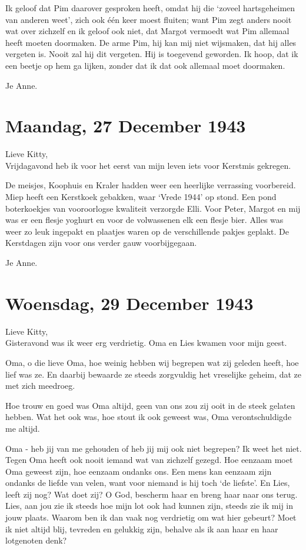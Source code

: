 \documentclass{book}
\begin{document}
Ik geloof dat Pim daarover gesproken heeft, omdat hij die `zoveel hartsgeheimen
van anderen weet', zich ook één keer moest fluiten; want Pim zegt anders nooit
wat over zichzelf en ik geloof ook niet, dat Margot vermoedt wat Pim allemaal
heeft moeten doormaken. De arme Pim, hij kan mij niet wijsmaken, dat hij alles
vergeten is. Nooit zal hij dit vergeten. Hij is toegevend geworden. Ik hoop, dat
ik een beetje op hem ga lijken, zonder dat ik dat ook allemaal moet doormaken.

Je Anne.

\section*{Maandag, 27 December 1943}

Lieve Kitty,\\
Vrijdagavond heb ik voor het eerst van mijn leven iets voor
Kerstmis gekregen.

De meisjes, Koophuis en Kraler hadden weer een heerlijke verrassing voorbereid.
Miep heeft een Kerstkoek gebakken, waar `Vrede 1944' op stond. Een pond
boterkoekjes van vooroorlogse kwaliteit verzorgde Elli.  Voor Peter, Margot en
mij was er een flesje yoghurt en voor de volwassenen elk een flesje bier. Alles
was weer zo leuk ingepakt en plaatjes waren op de verschillende pakjes geplakt.
De Kerstdagen zijn voor ons verder gauw voorbijgegaan.

Je Anne.

\section*{Woensdag, 29 December 1943}

Lieve Kitty,\\
Gisteravond was ik weer erg verdrietig. Oma en Lies kwamen voor
mijn geest.

Oma, o die lieve Oma, hoe weinig hebben wij begrepen wat zij geleden heeft, hoe
lief was ze. En daarbij bewaarde ze steeds zorgvuldig het vreselijke geheim, dat
ze met zich meedroeg.

Hoe trouw en goed was Oma altijd, geen van ons zou zij ooit in de steek gelaten
hebben. Wat het ook was, hoe stout ik ook geweest was, Oma verontschuldigde me
altijd.

Oma - heb jij van me gehouden of heb jij mij ook niet begrepen? Ik weet het
niet. Tegen Oma heeft ook nooit iemand wat van zichzelf gezegd. Hoe eenzaam moet
Oma geweest zijn, hoe eenzaam ondanks ons. Een mens kan eenzaam zijn ondanks de
liefde van velen, want voor niemand is hij toch `de liefste'. En Lies, leeft zij
nog? Wat doet zij? O God, bescherm haar en breng haar naar ons terug. Lies, aan
jou zie ik steeds hoe mijn lot ook had kunnen zijn, steeds zie ik mij in jouw
plaats. Waarom ben ik dan vaak nog verdrietig om wat hier gebeurt? Moet ik niet
altijd blij, tevreden en gelukkig zijn, behalve als ik aan haar en haar
lotgenoten denk?
\end{document}
